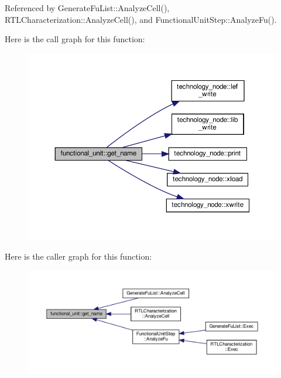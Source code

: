 Referenced by Generate\+Fu\+List\+::\+Analyze\+Cell(), R\+T\+L\+Characterization\+::\+Analyze\+Cell(), and Functional\+Unit\+Step\+::\+Analyze\+Fu().

Here is the call graph for this function\+:
\nopagebreak
\begin{figure}[H]
\begin{center}
\leavevmode
\includegraphics[width=350pt]{d8/dd6/structfunctional__unit_a9761616dcfc8f37c93431d4260127ceb_cgraph}
\end{center}
\end{figure}
Here is the caller graph for this function\+:
\nopagebreak
\begin{figure}[H]
\begin{center}
\leavevmode
\includegraphics[width=350pt]{d8/dd6/structfunctional__unit_a9761616dcfc8f37c93431d4260127ceb_icgraph}
\end{center}
\end{figure}
\mbox{\label{structfunctional__unit_a4e2dee20e6116b84d95e97b9ccbb3e7d}} 
